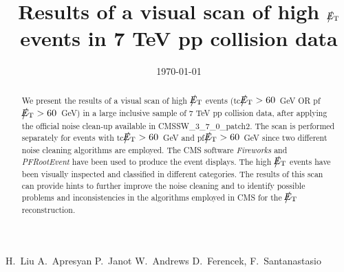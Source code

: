 \documentclass{cmspaper}
\def\etmiss{\big\slash\hspace{-1.6ex}{E_\text{T}}}
\begin{document}


\begin{titlepage}


  \date{\today}

  \title{Results of a visual scan of high $\etmiss$ events in 7 TeV pp collision data}

  \begin{Authlist}
    H.~Liu
    A.~Apresyan
    P.~Janot
    W.~Andrews
    D.~Ferencek, F.~Santanastasio %
  \end{Authlist}



  \begin{abstract}    
   We present the results of a visual scan of high $\etmiss$ events 
   (tc$\etmiss>60$~GeV OR pf$\etmiss>60$~GeV)
   in a large inclusive sample of 7 TeV pp collision data, 
   after applying the official noise clean-up available in CMSSW\_3\_7\_0\_patch2. 
   The scan is performed separately for events with tc$\etmiss>60$~GeV and pf$\etmiss>60$~GeV
   since two different noise cleaning algorithms are employed.
   The CMS software {\it Fireworks} and {\it PFRootEvent} have been used to produce the event displays. 
   The high $\etmiss$ events have been visually inspected and classified in different 
   categories. The results of this scan can provide hints to further improve the noise 
   cleaning and to identify possible problems and inconsistencies in the algorithms employed 
   in CMS for the $\etmiss$ reconstruction.
  \end{abstract} 

  
\end{titlepage}

\setcounter{page}{2}%

\tableofcontents

\clearpage





\clearpage

\clearpage



\end{document}
